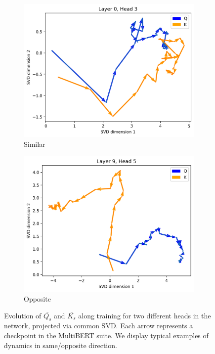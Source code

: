 \begin{figure}[ht]
    \centering
    \begin{subfigure}[b]{0.48\columnwidth}
         \includegraphics[width=\linewidth]{sources/part_1/anisotropy/imgs/l0h3_samedir_QK.png}
         \caption{Similar}
         \label{fig:QK_simdir}
    \end{subfigure}
    \begin{subfigure}[b]{0.48\columnwidth}
         \includegraphics[width=\linewidth]{sources/part_1/anisotropy/imgs/l9h5_diffdir_QK.png}
         \caption{Opposite}
         \label{fig:QK_diffdir}
    \end{subfigure}
    \caption{Evolution of $\bar{Q_s}$ and $\bar{K_s}$ along training for two different heads in the network, projected via common SVD. Each arrow represents a checkpoint in the MultiBERT suite. We display typical examples of dynamics in same/opposite direction.}
    \label{fig:QK_dir}
\end{figure}

